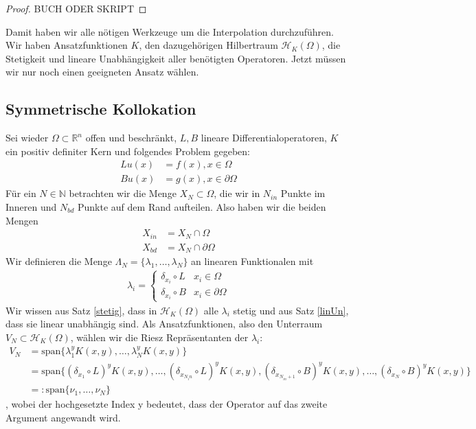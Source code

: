 \begin{proof}
BUCH ODER SKRIPT
\end{proof}


Damit haben wir alle nötigen Werkzeuge um die Interpolation durchzuführen. Wir haben Ansatzfunktionen $K$, den dazugehörigen Hilbertraum $\mathcal{H}_K(\Omega)$, die Stetigkeit und lineare Unabhängigkeit aller benötigten Operatoren. Jetzt müssen wir nur noch einen geeigneten Ansatz wählen.
\subsection{Symmetrische Kollokation}
Sei wieder $\Omega \subset \mathbb{R}^n$ offen und beschränkt, $L,B$ lineare Differentialoperatoren, $K$ ein positiv definiter Kern und folgendes Problem gegeben:
\begin{align*}
L u(x) &= f(x), x \in \Omega \\
B u(x) &= g(x), x \in \partial \Omega
\end{align*}
Für ein $N \in \mathbb{N}$ betrachten wir die Menge $X_N \subset \Omega$, die wir in $N_{in}$ Punkte im Inneren und $N_{bd}$ Punkte auf dem Rand aufteilen. Also haben wir die beiden Mengen
\begin{align*}
X_{in} &= X_N \cap \Omega\\
X_{bd} &= X_N \cap \partial \Omega
\end{align*}
Wir definieren die Menge $\Lambda_N = \{\lambda_1, \dots, \lambda_N\}$ an linearen Funktionalen mit
\begin{align*}
\lambda_i =
\begin{cases}
\delta_{x_i} \circ L & x_i \in \Omega\\
\delta_{x_i} \circ B & x_i \in \partial \Omega
\end{cases}
\end{align*}
Wir wissen aus Satz \ref{stetig}, dass in $\mathcal{H}_K(\Omega)$ alle $\lambda_i$ stetig und aus Satz \ref{linUn}, dass sie linear unabhängig sind. Als Ansatzfunktionen, also den Unterraum $V_N \subset \mathcal{H}_K(\Omega)$, wählen wir die Riesz Repräsentanten der $\lambda_i$:
\begin{align*}
V_N &= \text{span} \{\lambda_1^y K(x,y), \dots , \lambda_N^y K(x,y)\}\\
&= \text{span} \{(\delta_{x_1} \circ L)^y K(x,y), \dots, (\delta_{x_{N_in}} \circ L)^y K(x,y), (\delta_{x_{N_{in} + 1}} \circ B)^y K(x,y), \dots, (\delta_{x_{N}} \circ B)^y K(x,y)\}\\
&=: \text{span} \{\nu_1, \dots, \nu_N\}
\end{align*}
, wobei der hochgesetzte Index y bedeutet, dass der Operator auf das zweite Argument angewandt wird.

